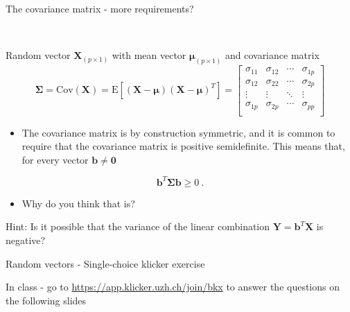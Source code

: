 \documentclass[ignorenonframetext,]{beamer}
\providecommand{\tightlist}{%
  \setlength{\itemsep}{0pt}\setlength{\parskip}{0pt}}
\begin{document}
\begin{frame}

\begin{block}{The covariance matrix - more requirements?}

\(~\)

Random vector \(\boldsymbol{X}_{(p\times 1)}\) with mean vector
\(\boldsymbol{\mu}_{(p\times 1)}\) and covariance matrix
\[\boldsymbol\Sigma=\text{Cov}(\boldsymbol{X})=\text{E}[(\boldsymbol{X}-\boldsymbol{\mu})(\boldsymbol{X}-\boldsymbol{\mu})^T]=
\left[ \begin{array}{cccc}
    \sigma_{11} & \sigma_{12} & \cdots & \sigma_{1p}\\
    \sigma_{12} & \sigma_{22} & \cdots & \sigma_{2p}\\
    \vdots & \vdots & \ddots & \vdots\\
    \sigma_{1p} & \sigma_{2p} & \cdots & \sigma_{pp}\\
\end{array} \right]\]

\end{block}

\end{frame}

\begin{frame}

\begin{itemize}
\tightlist
\item
  The covariance matrix is by construction symmetric, and it is common
  to require that the covariance matrix is positive semidefinite. This
  means that, for every vector \(\boldsymbol{b}\neq \boldsymbol{0}\)
\end{itemize}

\[\boldsymbol{b}^T \boldsymbol{\Sigma} \boldsymbol{b} \geq 0 \ .\]

\begin{itemize}
\tightlist
\item
  Why do you think that is?
\end{itemize}

Hint: Is it possible that the variance of the linear combination
\(\boldsymbol{Y}=\boldsymbol{b}^T\boldsymbol{X}\) is negative?

\end{frame}

\begin{frame}

\begin{block}{Random vectors - Single-choice klicker exercise}

\vspace{4mm}

In class - go to \url{https://app.klicker.uzh.ch/join/bkx} to answer the
questions on the following slides

\end{block}

\end{frame}
\end{document}
